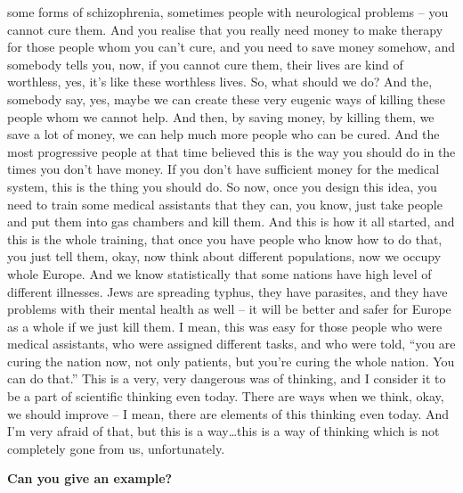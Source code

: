 some forms of schizophrenia, sometimes people with neurological problems – you cannot cure them. And you realise that you really need money to make therapy for those people whom you can’t cure, and you need to save money somehow, and somebody tells you, now, if you cannot cure them, their lives are kind of worthless, yes, it’s like these worthless lives. So, what should we do? And the, somebody say, yes, maybe we can create these very eugenic ways of killing these people whom we cannot help. And then, by saving money, by killing them, we save a lot of money, we can help much more people who can be cured. And the most progressive people at that time believed this is the way you should do in the times you don’t have money. If you don’t have sufficient money for the medical system, this is the thing you should do. So now, once you design this idea, you need to train some medical assistants that they can, you know, just take people and put them into gas chambers and kill them. And this is how it all started, and this is the whole training, that once you have people who know how to do that, you just tell them, okay, now think about different populations, now we occupy whole Europe. And we know statistically that some nations have high level of different illnesses. Jews are spreading typhus, they have parasites, and they have problems with their mental health as well – it will be better and safer for Europe as a whole if we just kill them. I mean, this was easy for those people who were medical assistants, who were assigned different tasks, and who were told, “you are curing the nation now, not only patients, but you’re curing the whole nation. You can do that.” This is a very, very dangerous was of thinking, and I consider it to be a part of scientific thinking even today. There are ways when we think, okay, we should improve – I mean, there are elements of this thinking even today. And I’m very afraid of that, but this is a way…this is a way of thinking which is not completely gone from us, unfortunately.

\textbf{Can you give an example?} 

